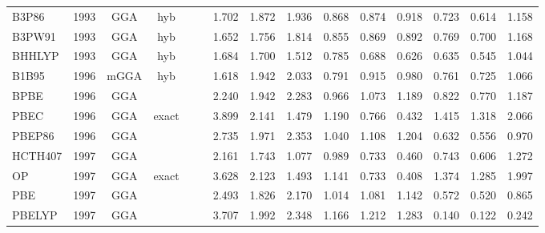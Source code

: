 \begin{landscape}
\begin{longtable}{lcccccrrrrrrrrr}
    B3P86            & 1993 & GGA  & hyb      &             &           & 1.702             & 1.872             & 1.936  & 0.868              & 0.874             & 0.918  & 0.723   & 0.614 & 1.158 \\
    B3PW91           & 1993 & GGA  & hyb      &             &           & 1.652             & 1.756             & 1.814  & 0.855              & 0.869             & 0.892  & 0.769   & 0.700 & 1.168 \\
    BHHLYP           & 1993 & GGA  & hyb      &             &           & 1.684             & 1.700             & 1.512  & 0.785              & 0.688             & 0.626  & 0.635   & 0.545 & 1.044 \\
    B1B95            & 1996 & mGGA & hyb      &             &           & 1.618             & 1.942             & 2.033  & 0.791              & 0.915             & 0.980  & 0.761   & 0.725 & 1.066 \\
    BPBE             & 1996 & GGA  &          &             &           & 2.240             & 1.942             & 2.283  & 0.966              & 1.073             & 1.189  & 0.822   & 0.770 & 1.187 \\
    PBEC             & 1996 & GGA  & exact    &             &           & 3.899             & 2.141             & 1.479  & 1.190              & 0.766             & 0.432  & 1.415   & 1.318 & 2.066 \\
    PBEP86           & 1996 & GGA  &          &             &           & 2.735             & 1.971             & 2.353  & 1.040              & 1.108             & 1.204  & 0.632   & 0.556 & 0.970 \\
    HCTH407          & 1997 & GGA  &          &             &           & 2.161             & 1.743             & 1.077  & 0.989              & 0.733             & 0.460  & 0.743   & 0.606 & 1.272 \\
    OP               & 1997 & GGA  & exact    &             &           & 3.628             & 2.123             & 1.493  & 1.141              & 0.733             & 0.408  & 1.374   & 1.285 & 1.997 \\
    PBE              & 1997 & GGA  &          &             &           & 2.493             & 1.826             & 2.170  & 1.014              & 1.081             & 1.142  & 0.572   & 0.520 & 0.865 \\
    PBELYP           & 1997 & GGA  &          &             &           & 3.707             & 1.992             & 2.348  & 1.166              & 1.212             & 1.283  & 0.140   & 0.122 & 0.242 \\

\end{longtable}
\end{landscape}
